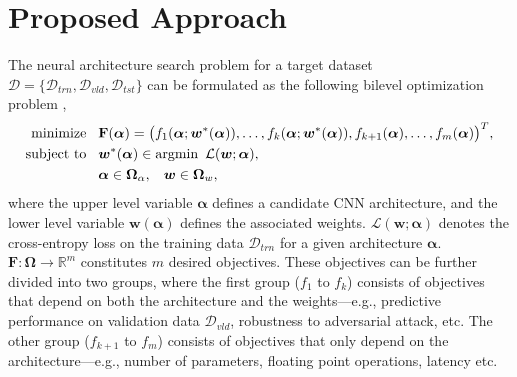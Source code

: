 \documentclass[runningheads]{llncs}
\def\argmin{\mathop{\rm argmin}\limits}
\def\Minimize{\mathop{\rm minimize}\limits}
\def\st{\mathop{\rm subject\ to}}
\begin{document}
 \section{Proposed Approach \label{sec:approach}}

The neural architecture search problem for a target dataset $\mathcal{D} = \{\mathcal{D}_{trn}, \mathcal{D}_{vld}, \mathcal{D}_{tst}\}$ can be formulated as the following bilevel optimization problem \cite{bilevel},
\begin{equation}
\begin{aligned}
\Minimize & \hspace{3mm} \mathbf{F}(\bm{\alpha}) = \big(f_1(\bm{\alpha}; \bm{w}^*(\bm{\alpha})), \ldots, f_k(\bm{\alpha}; \bm{w}^*(\bm{\alpha})), f_{k+1}(\bm{\alpha}), \ldots, f_m(\bm{\alpha})\big)^T, \\
\st  & \hspace{3mm} \bm{w}^*(\bm{\alpha}) \in \argmin~\mathcal{L}(\bm{w};\bm{\alpha}), \\
     & \hspace{3mm} \bm{\alpha} \in \mathbf{\Omega}_{\alpha}, \hspace{3mm} \bm{w} \in \mathbf{\Omega}_{w},
\end{aligned}
\label{def:bilevel}
\end{equation}
where the upper level variable $\bm{\alpha}$ defines a candidate CNN architecture, and the lower level variable $\bm{w}(\bm{\alpha})$ defines the associated weights. $\mathcal{L}(\bm{w};\bm{\alpha})$ denotes the cross-entropy loss on the training data $\mathcal{D}_{trn}$ for a given architecture $\bm{\alpha}$. $\mathbf{F}: \mathbf{\Omega} \rightarrow \mathbb{R}^m$ constitutes $m$ desired objectives. These objectives can be further divided into two groups, where the first group ($f_1$ to $f_k$) consists of objectives that depend on both the architecture and the weights---e.g., predictive performance on validation data $\mathcal{D}_{vld}$, robustness to adversarial attack, etc. The other group ($f_{k+1}$ to $f_m$) consists of objectives that only depend on the architecture---e.g., number of parameters, floating point operations, latency etc.
\end{document}
